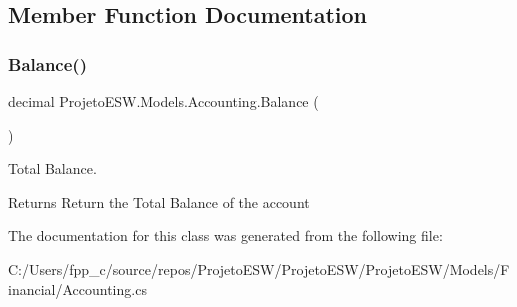 \subsection{Member Function Documentation}
\mbox{\label{class_projeto_e_s_w_1_1_models_1_1_accounting_ad5a95a7e8c35b6c76536606b50f8e7a2}} 
\subsubsection{\texorpdfstring{Balance()}{Balance()}}
{\footnotesize\ttfamily decimal Projeto\+E\+S\+W.\+Models.\+Accounting.\+Balance (\begin{DoxyParamCaption}{ }\end{DoxyParamCaption})}



Total Balance.

\begin{DoxyReturn}{Returns}
Return the Total Balance of the account
\end{DoxyReturn}


The documentation for this class was generated from the following file\+:\begin{DoxyCompactItemize}
\item 
C\+:/\+Users/fpp\+\_\+c/source/repos/\+Projeto\+E\+S\+W/\+Projeto\+E\+S\+W/\+Projeto\+E\+S\+W/\+Models/\+Financial/Accounting.\+cs\end{DoxyCompactItemize}
